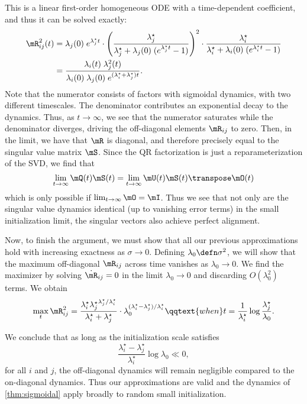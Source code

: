 This is a linear first-order homogeneous ODE with a time-dependent coefficient, and thus it can be solved exactly:
\begin{align}
    \mR_{ij}^2(t) 
    &=  \lambda_j(0)\;e^{\lambda^\star_j t} \cdot
    \left(\frac{\lambda^\star_j}{\lambda^\star_j + \lambda_j(0)\;(e^{\lambda^\star_j t} - 1)}\right)^2 \cdot \frac{\lambda^\star_i}{\lambda^\star_i + \lambda_i(0)\;(e^{\lambda^\star_i t} - 1)}
    \\
    &= \frac{\lambda_i(t) \; \lambda_j^2(t)}{\lambda_i(0)\;\lambda_j(0) \;e^{(\lambda^\star_i+\lambda^\star_j) t}}.
\end{align}
Note that the numerator consists of factors with sigmoidal dynamics, with two different timescales. The denominator contributes an exponential decay to the dynamics. Thus, as $t\to\infty$, we see that the numerator saturates while the denominator diverges, driving the off-diagonal elements $\mR_{ij}$ to zero. Then, in the limit, we have that $\mR$ is diagonal, and therefore precisely equal to the singular value matrix $\mS$. Since the QR factorization is just a reparameterization of the SVD, we find that
\begin{equation}
    \lim_{t\to\infty}\mQ(t)\mS(t) = \lim_{t\to\infty}\mU(t)\mS(t)\T\mO(t)
\end{equation}
which is only possible if $\lim_{t\to\infty}\mO=\mI$. Thus we see that not only are the singular value dynamics identical (up to vanishing error terms) in the small initialization limit, the singular vectors also achieve perfect alignment.

Now, to finish the argument, we must show that all our previous approximations hold with increasing exactness as $\sigma\to 0$. Defining $\lambda_0\defn\sigma^2$, we will show that the maximum off-diagonal $\mR_{ij}$ across time vanishes as $\lambda_0\to 0$. We find the maximizer by solving $\dot\mR_{ij}=0$ in the limit $\lambda_0\to0$ and discarding $O(\lambda_0^2)$ terms. We obtain
\begin{equation}
    \max_t \mR_{ij}^2=\frac{\lambda^\star_i {\lambda^\star_j}^{\lambda^\star_j/\lambda^\star_i}}{\lambda^\star_i+\lambda^\star_j} \cdot \lambda_0^{(\lambda^\star_i-\lambda^\star_j)/\lambda^\star_i}
    \qqtext{when}
    t = \frac{1}{\lambda^\star_i}\log\frac{\lambda^\star_j}{\lambda_0}.
\end{equation}

We conclude that as long as the initialization scale satisfies
\begin{equation}
    \frac{\lambda^\star_i-\lambda^\star_j}{\lambda^\star_i}\log\lambda_0 \ll 0,
\end{equation}
for all $i$ and $j$, the off-diagonal dynamics will remain negligible compared to the on-diagonal dynamics. Thus our approximations are valid and the dynamics of \cref{thm:sigmoidal} apply broadly to random small initialization.


